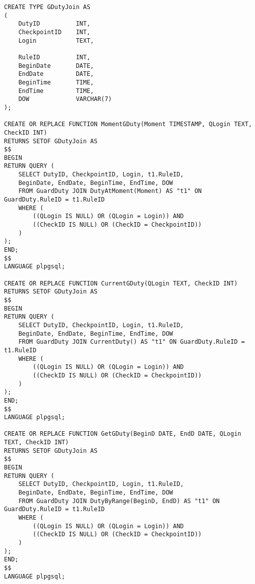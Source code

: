 \begin{lstlisting}[caption = {Релизация функций для таблицы GuardDuty}, label=lst:guard_duty_f]
CREATE TYPE GDutyJoin AS
(
	DutyID 			INT,
	CheckpointID	INT,
	Login			TEXT,
	
	RuleID			INT,
	BeginDate		DATE,
	EndDate			DATE,
	BeginTime		TIME,
	EndTime			TIME,
	DOW				VARCHAR(7)
);

CREATE OR REPLACE FUNCTION MomentGDuty(Moment TIMESTAMP, QLogin TEXT, CheckID INT)
RETURNS SETOF GDutyJoin AS
$$
BEGIN
RETURN QUERY (
	SELECT DutyID, CheckpointID, Login, t1.RuleID, 
	BeginDate, EndDate, BeginTime, EndTime, DOW
	FROM GuardDuty JOIN DutyAtMoment(Moment) AS "t1" ON GuardDuty.RuleID = t1.RuleID
	WHERE (
		((QLogin IS NULL) OR (QLogin = Login)) AND
		((CheckID IS NULL) OR (CheckID = CheckpointID))
	)
);
END;
$$
LANGUAGE plpgsql;

CREATE OR REPLACE FUNCTION CurrentGDuty(QLogin TEXT, CheckID INT)
RETURNS SETOF GDutyJoin AS
$$
BEGIN
RETURN QUERY (
	SELECT DutyID, CheckpointID, Login, t1.RuleID, 
	BeginDate, EndDate, BeginTime, EndTime, DOW
	FROM GuardDuty JOIN CurrentDuty() AS "t1" ON GuardDuty.RuleID = t1.RuleID
	WHERE (
		((QLogin IS NULL) OR (QLogin = Login)) AND
		((CheckID IS NULL) OR (CheckID = CheckpointID))
	)
);
END;
$$
LANGUAGE plpgsql;

CREATE OR REPLACE FUNCTION GetGDuty(BeginD DATE, EndD DATE, QLogin TEXT, CheckID INT)
RETURNS SETOF GDutyJoin AS
$$
BEGIN
RETURN QUERY (
	SELECT DutyID, CheckpointID, Login, t1.RuleID, 
	BeginDate, EndDate, BeginTime, EndTime, DOW
	FROM GuardDuty JOIN DutyByRange(BeginD, EndD) AS "t1" ON GuardDuty.RuleID = t1.RuleID
	WHERE (
		((QLogin IS NULL) OR (QLogin = Login)) AND
		((CheckID IS NULL) OR (CheckID = CheckpointID))
	)
);
END;
$$
LANGUAGE plpgsql;
\end{lstlisting}
